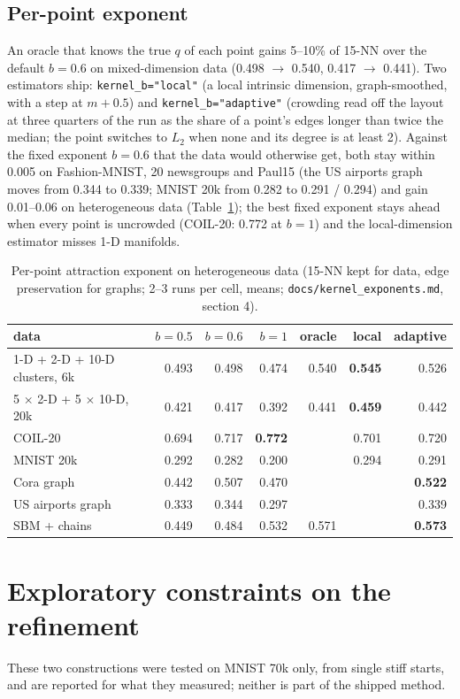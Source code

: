 \documentclass[11pt]{article}
\begin{document}
\subsection{Per-point exponent}
An oracle that knows the true $q$ of each point gains 5--10\% of 15-NN over the default $b = 0.6$ on
mixed-dimension data (0.498 $\to$ 0.540, 0.417 $\to$ 0.441). Two estimators ship:
\texttt{kernel\_b="local"} (a local intrinsic dimension, graph-smoothed, with a step at $m + 0.5$) and
\texttt{kernel\_b="adaptive"} (crowding read off the layout at three quarters of the run as the share of
a point's edges longer than twice the median; the point switches to $L_2$ when none and its degree is
at least 2). Against the fixed exponent $b = 0.6$ that the data would otherwise get, both stay within
0.005 on Fashion-MNIST, 20 newsgroups and Paul15 (the US airports graph moves from 0.344 to 0.339; MNIST
20k from 0.282 to 0.291 / 0.294) and gain 0.01--0.06 on heterogeneous data (Table~\ref{tab:adaptive}); the best fixed
exponent stays ahead when every point is uncrowded (COIL-20: 0.772 at $b = 1$) and the local-dimension
estimator misses 1-D manifolds.

\begin{table}[t]
\centering\small
\caption{Per-point attraction exponent on heterogeneous data (15-NN kept for data, edge preservation for
graphs; 2--3 runs per cell, means; \texttt{docs/kernel\_exponents.md}, section 4).}
\label{tab:adaptive}
\begin{tabular}{lrrrrrr}
\toprule
data & $b=0.5$ & $b=0.6$ & $b=1$ & oracle & local & adaptive \\
\midrule
1-D + 2-D + 10-D clusters, 6k & 0.493 & 0.498 & 0.474 & 0.540 & \textbf{0.545} & 0.526 \\
5 $\times$ 2-D + 5 $\times$ 10-D, 20k & 0.421 & 0.417 & 0.392 & 0.441 & \textbf{0.459} & 0.442 \\
COIL-20 & 0.694 & 0.717 & \textbf{0.772} & & 0.701 & 0.720 \\
MNIST 20k & 0.292 & 0.282 & 0.200 & & 0.294 & 0.291 \\
Cora graph & 0.442 & 0.507 & 0.470 & & & \textbf{0.522} \\
US airports graph & 0.333 & 0.344 & 0.297 & & & 0.339 \\
SBM + chains & 0.449 & 0.484 & 0.532 & 0.571 & & \textbf{0.573} \\
\bottomrule
\end{tabular}
\end{table}

\section{Exploratory constraints on the refinement}\label{app:explore}
These two constructions were tested on MNIST 70k only, from single stiff starts, and are reported for
what they measured; neither is part of the shipped method.
\end{document}
